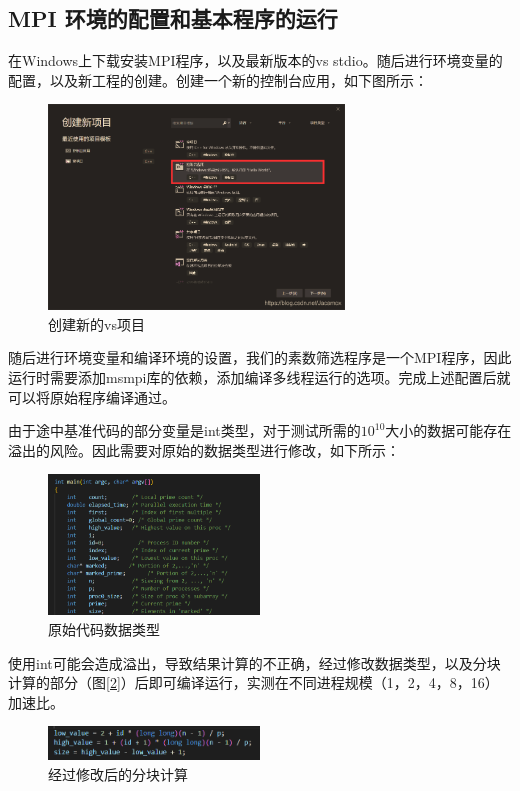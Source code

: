 \documentclass[a4paper,11pt,UTF8]{ctexart}
\begin{document}
\subsection{MPI 环境的配置和基本程序的运行}
在Windows上下载安装MPI程序，以及最新版本的vs stdio。随后进行环境变量的配置，以及新工程的创建。创建一个新的控制台应用，如下图所示：
\begin {figure}[h]
\centering %
\includegraphics[width=0.7\textwidth]{3509-041319.png}
\caption{创建新的vs项目} %
\label{five}
\end {figure}

\newpage
 随后进行环境变量和编译环境的设置，我们的素数筛选程序是一个MPI程序，因此运行时需要添加msmpi库的依赖，添加编译多线程运行的选项。完成上述配置后就可以将原始程序编译通过。

由于途中基准代码的部分变量是int类型，对于测试所需的$10^{10}$大小的数据可能存在溢出的风险。因此需要对原始的数据类型进行修改，如下所示：

\begin {figure}[h]
\centering %
\includegraphics[width=0.5\textwidth]{4940-041319.png}
\caption{原始代码数据类型} %
\label{five}
\end {figure}

使用int可能会造成溢出，导致结果计算的不正确，经过修改数据类型，以及分块计算的部分（图\ref{2}）后即可编译运行，实测在不同进程规模（1，2，4，8，16）加速比。
\begin {figure}[h]
\centering %
\includegraphics[width=0.5\textwidth]{5541-041319.png}
\caption{经过修改后的分块计算} %
\label{five}
\end {figure}
\end{document}
